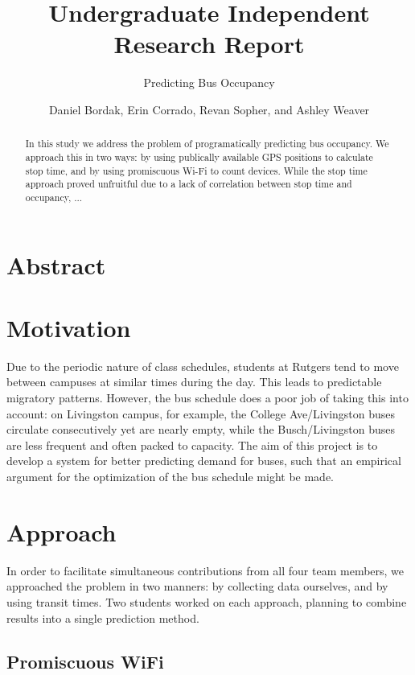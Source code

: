 \documentclass[letterpaper,english]{scrartcl}
\begin{document}
\title{Undergraduate Independent Research Report}
\subtitle{Predicting Bus Occupancy}
\author{Daniel Bordak, Erin Corrado, Revan Sopher, and Ashley Weaver}

\maketitle

\section*{Abstract}
\begin{abstract}
In this study we address the problem of programatically predicting bus occupancy.
We approach this in two ways: by using publically available GPS positions to calculate stop time, and by using promiscuous Wi-Fi to count devices.
While the stop time approach proved unfruitful due to a lack of correlation between stop time and occupancy, ...
\end{abstract}

\section*{Motivation}

Due to the periodic nature of class schedules, students at Rutgers tend to move between campuses at similar times during the day.
This leads to predictable migratory patterns. However, the bus schedule does a poor job of taking this into account: on Livingston campus, for example, the College Ave/Livingston buses circulate consecutively yet are nearly empty, while the Busch/Livingston buses are less frequent and often packed to capacity.
The aim of this project is to develop a system for better predicting demand for buses, such that an empirical argument for the optimization of the bus schedule might be made.

\section*{Approach}

In order to facilitate simultaneous contributions from all four team members, we approached the problem in two manners: by collecting data ourselves, and by using transit times.
Two students worked on each approach, planning to combine results into a single prediction method.

\subsection*{Promiscuous WiFi}
\end{document}
